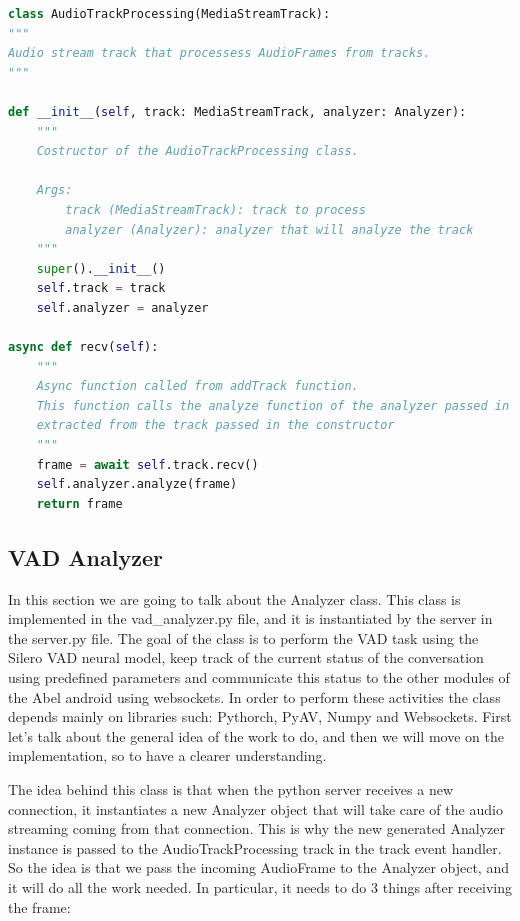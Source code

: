 \documentclass[../main.tex]{subfiles}
\begin{document}
\begin{lstlisting}[language=Python, caption=AudioTrackProcessing class implementation]
class AudioTrackProcessing(MediaStreamTrack):
"""
Audio stream track that processess AudioFrames from tracks.
"""

def __init__(self, track: MediaStreamTrack, analyzer: Analyzer):
    """
    Costructor of the AudioTrackProcessing class.

    Args:
        track (MediaStreamTrack): track to process
        analyzer (Analyzer): analyzer that will analyze the track
    """
    super().__init__()
    self.track = track
    self.analyzer = analyzer

async def recv(self):
    """
    Async function called from addTrack function.
    This function calls the analyze function of the analyzer passed in the constructor on the AudioFrame
    extracted from the track passed in the constructor
    """
    frame = await self.track.recv()
    self.analyzer.analyze(frame)
    return frame    
\end{lstlisting}
\label{listing:AudioTrackProcessing}

\subsection{VAD Analyzer}
\label{vad analyzer}

In this section we are going to talk about the Analyzer class. This class is implemented in the vad\_analyzer.py file, and it is instantiated by the server in the server.py file. The goal of the class is to perform the VAD task using the Silero VAD neural model, keep track of the current status of the conversation using predefined parameters and communicate this status to the other modules of the Abel android using websockets. In order to perform these activities the class depends mainly on libraries such: Pythorch, PyAV, Numpy and Websockets. First let's talk about the general idea of the work to do, and then we will move on the implementation, so to have a clearer understanding.

The idea behind this class is that when the python server receives a new connection, it instantiates a new Analyzer object that will take care of the audio streaming coming from that connection. This is why the new generated Analyzer instance is passed to the AudioTrackProcessing track in the track event handler. So the idea is that we pass the incoming AudioFrame to the Analyzer object, and it will do all the work needed. In particular, it needs to do 3 things after receiving the frame:
\end{document}
